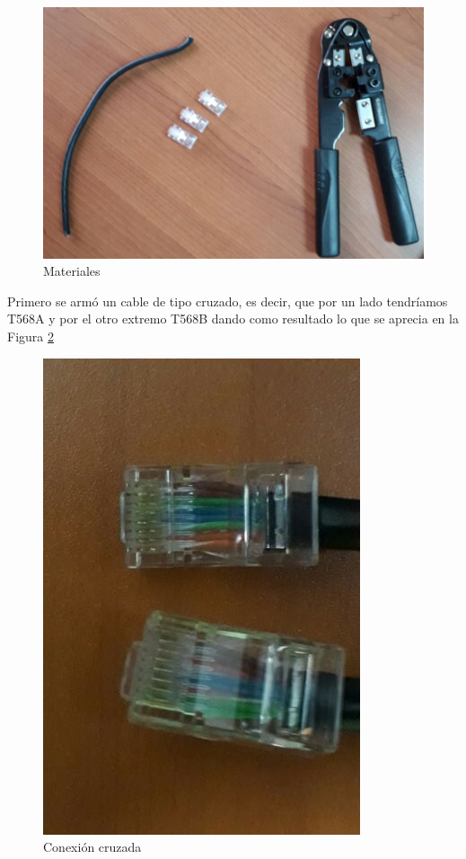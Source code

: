 \documentclass{article}
\begin{document}
\begin{figure}[h!]
\centering
\includegraphics[scale=0.2 , angle = 90]{materiales.jpg}
\caption{Materiales}
\label{fig:material}
\end{figure}

Primero se armó un cable de tipo cruzado, es decir, que por un lado tendríamos T568A y por el otro extremo T568B dando como resultado lo que se aprecia en la Figura \ref{fig:cruz}

\begin{figure}[h!]
\centering
\includegraphics[scale=0.3 , angle = -90]{Cruzado.jpg}
\caption{Conexión cruzada}
\label{fig:cruz}
\end{figure}
\end{document}
